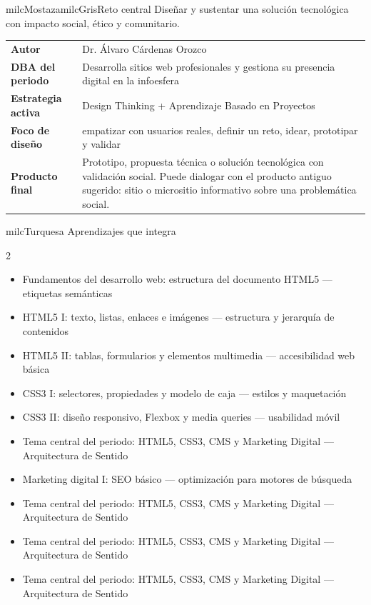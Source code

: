 \documentclass[11pt,letterpaper]{article}
\begin{document}
\begin{softbox}{milcMostaza}{milcGris}{Reto central}
Diseñar y sustentar una solución tecnológica con impacto social, ético y comunitario.
\end{softbox}

\begin{tabularx}{\textwidth}{>{\bfseries}p{3.4cm}X}
\rowcolor{milcMagenta!12}Autor & Dr. Álvaro Cárdenas Orozco\\
DBA del periodo & Desarrolla sitios web profesionales y gestiona su presencia digital en la infoesfera\\
Estrategia activa & Design Thinking + Aprendizaje Basado en Proyectos\\
Foco de diseño & empatizar con usuarios reales, definir un reto, idear, prototipar y validar\\
Producto final & Prototipo, propuesta técnica o solución tecnológica con validación social. Puede dialogar con el producto antiguo sugerido: sitio o micrositio informativo sobre una problemática social.\\
\end{tabularx}

\begin{titlebox}{milcTurquesa}
Aprendizajes que integra
\end{titlebox}
\begin{multicols}{2}
\begin{itemize}[leftmargin=*]
\item Fundamentos del desarrollo web: estructura del documento HTML5 — etiquetas semánticas
\item HTML5 I: texto, listas, enlaces e imágenes — estructura y jerarquía de contenidos
\item HTML5 II: tablas, formularios y elementos multimedia — accesibilidad web básica
\item CSS3 I: selectores, propiedades y modelo de caja — estilos y maquetación
\item CSS3 II: diseño responsivo, Flexbox y media queries — usabilidad móvil
\item Tema central del periodo: HTML5, CSS3, CMS y Marketing Digital — Arquitectura de Sentido
\item Marketing digital I: SEO básico — optimización para motores de búsqueda
\item Tema central del periodo: HTML5, CSS3, CMS y Marketing Digital — Arquitectura de Sentido
\item Tema central del periodo: HTML5, CSS3, CMS y Marketing Digital — Arquitectura de Sentido
\item Tema central del periodo: HTML5, CSS3, CMS y Marketing Digital — Arquitectura de Sentido
\end{itemize}
\end{multicols}
\end{document}
